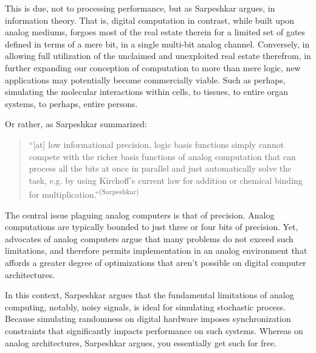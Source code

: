 This is due, not to processing performance, but as Sarpeshkar argues, in information theory. That is, digital computation in contrast, while built upon analog mediums, forgoes most of the real estate therein for a limited set of gates defined in terms of a mere bit, in a single multi-bit analog channel. Conversely, in allowing full utilization of the unclaimed and unexploited real estate therefrom, in further expanding our conception of computation to more than mere logic, new applications may potentially become commercially viable. Such as perhaps, simulating the molecular interactions within cells, to tissues, to entire organ systems, to perhaps, entire persons.

Or rather, as Sarpeshkar summarized:

\begin{quotation}
    ``[at] low informational precision, logic basis functions simply cannot compete with the richer basis functions of analog computation that can process all the bits at once in parallel and just automatically solve the task, e.g. by using Kirchoff’s current law for addition or chemical binding for multiplication.''\textsuperscript{(Sarpeshkar)}
\end{quotation}


The central issue plaguing analog computers is that of precision. Analog computations are typically bounded to just three or four bits of precision. Yet, advocates of analog computers argue that many problems do not exceed such limitations, and therefore permits implementation in an analog environment that affords a greater degree of optimizations that aren't possible on digital computer architectures. 

In this context, Sarpeshkar argues that the fundamental limitations of analog computing, notably, noisy signals, is ideal for simulating stochastic process. Because simulating randomness on digital hardware imposes synchronization constraints that significantly impacts performance on such systems. Whereas on analog architectures, Sarpeshkar argues, you essentially get such for free.


